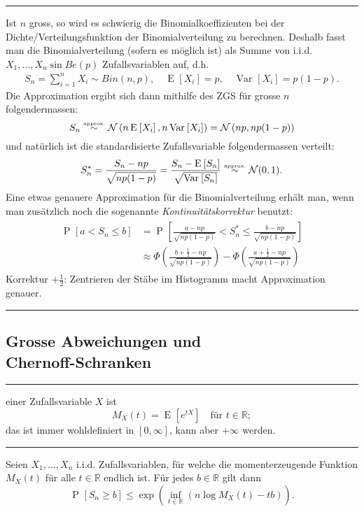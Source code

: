 \documentclass[a4paper, 12pt]{extarticle}
\newcommand{\sep}{\vspace{5pt}\noindent\hrule\vspace{5pt}}
\newcommand{\R}{\mathbb{R}}
\newcommand{\cN}{\mathcal{N}}
\newcommand{\Prob}[2][]{\operatorname{P}_{#1}\left[ #2 \right]}
\newcommand{\Var}[2][]{\operatorname{Var}_{#1}\left[ #2 \right]}
\newcommand{\Exp}[2][]{\operatorname{E}_{#1}\left[ #2 \right]}
\newcommand{\approxsim}{\stackrel{\text{\tiny approx.}}{\sim}}
\begin{document}
\begin{multicols*}{2}
\sep

 Ist $n$ gross, so wird
es schwierig die Binomialkoeffizienten bei der Dichte/Verteilungsfunktion der
Binomialverteilung zu berechnen. Deshalb fasst man die Binomialverteilung
(sofern es möglich ist) als Summe von i.i.d. $X_1,\ldots,X_n\sin Be(p)$
Zufallsvariablen auf, d.h.
\begin{gather*}
S_{n}=\sum_{i=1}^{n} X_i \sim Bin(n,p),
\quad
\Exp{X_i}=p,
\quad
\Var{X_i}=p(1-p).
\end{gather*}
Die Approximation ergibt sich dann mithilfe des ZGS für grosse $n$
folgendermassen:
\[
S_{n}\approxsim\cN\left(n \Exp{X_i},
n\Var{X_i}\right)=\cN\left(np,np(1-p)\right)
\]
und natürlich ist die standardisierte Zufallsvariable folgendermassen verteilt:
\[
S_{n}^*=\frac{S_n-np}{\sqrt{np(1-p)}}=\frac{S_n - \Exp{S_n}}{\sqrt{\Var{S_n}}}
\approxsim \cN(0,1).
\]
Eine etwas genauere Approximation für die Binomialverteilung erhält man, wenn
man zusätzlich noch die sogenannte \emph{Kontinuitätskorrektur} benutzt:
\begin{gather*}
\begin{align*}
\Prob{a<S_n\leq b} &=
\Prob{\frac{a-np}{\sqrt{np(1-p)}}<S_n^*\leq\frac{b-np}{\sqrt{np(1-p)}}}
\\
&\approx
\Phi\left(\frac{b+\frac{1}{2}-np}{\sqrt{np(1-p)}}\right)
-
\Phi\left(\frac{a+\frac{1}{2}-np}{\sqrt{np(1-p)}}\right)
\end{align*}
\end{gather*}
Korrektur $+\frac{1}{2}$: Zentrieren der Stäbe im Histogramm macht Approximation
genauer.

\sep

\subsection{Grosse Abweichungen und\\ Chernoff-Schranken}

\sep

 einer Zufallsvariable $X$ ist
\[
M_X(t)=\Exp{e^{tX}} \quad \text{für }t\in\R;
\]
das ist immer wohldefiniert in $[0,\infty]$, kann aber $+\infty$ werden.

\sep

\Thm Seien $X_1,\ldots,X_n$ i.i.d. Zufallsvariablen, für welche die
momenterzeugende Funktion $M_X(t)$ für alle $t\in\R$ endlich ist. Für jedes
$b\in\R$ gilt dann
\[
\Prob{S_n\geq b} \leq \exp\left(\inf_{t\in\R} \left(n\log M_X(t)
-tb\right)\right).
\]


\end{multicols*}
\end{document}
